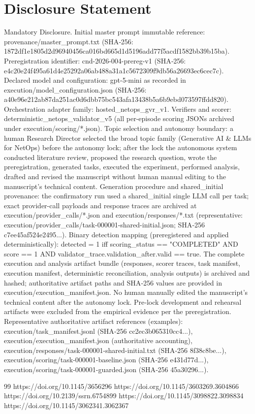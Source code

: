 \documentclass[conference]{IEEEtran}
\begin{document}
\section*{Disclosure Statement}
Mandatory Disclosure. Initial master prompt immutable reference: provenance/master\_prompt.txt (SHA‑256: 1872df1e1805d2d96940456ca016bd665d1d5196add77f5acdf1582bb39b15ba). Preregistration identifier: cnd-2026-004-prereg-v1 (SHA‑256: e4c20e24f495a61d4e25292a06ab488a31a1c5672309f9db56a26693ec6cec7c). Declared model and configuration: gpt-5-mini as recorded in execution/model\_configuration.json (SHA‑256: a40e96e212ab87da251ac0d6dbb75bc543afa13438b5a6b9ebd073597ffdd820). Orchestration adapter family: hosted\_netops\_gvr\_v1. Verifiers and scorer: deterministic\_netops\_validator\_v5 (all per-episode scoring JSONs archived under execution/scoring/*.json). Topic selection and autonomy boundary: a human Research Director selected the broad topic family (Generative AI \& LLMs for NetOps) before the autonomy lock; after the lock the autonomous system conducted literature review, proposed the research question, wrote the preregistration, generated tasks, executed the experiment, performed analysis, drafted and revised the manuscript without human manual editing to the manuscript's technical content. Generation procedure and shared\_initial provenance: the confirmatory run used a shared\_initial single LLM call per task; exact provider-call payloads and response traces are archived at execution/provider\_calls/*.json and execution/responses/*.txt (representative: execution/provider\_calls/task-000001-shared-initial.json; SHA‑256 c7ee45af524e2495...). Binary detection mapping (preregistered and applied deterministically): detected = 1 iff scoring\_status == "COMPLETED" AND score == 1 AND validator\_trace.validation\_after.valid == true. The complete execution and analysis artifact bundle (responses, scorer traces, task manifest, execution manifest, deterministic reconciliation, analysis outputs) is archived and hashed; authoritative artifact paths and SHA‑256 values are provided in execution/execution\_manifest.json. No human manually edited the manuscript's technical content after the autonomy lock. Pre‑lock development and rehearsal artifacts were excluded from the empirical evidence per the preregistration. Representative authoritative artifact references (examples): execution/task\_manifest.jsonl (SHA‑256 cc2ec3b065310cc4...), execution/execution\_manifest.json (authoritative accounting), execution/responses/task-000001-shared-initial.txt (SHA‑256 8f38c8be...), execution/scoring/task-000001-baseline.json (SHA‑256 e431d77d...), execution/scoring/task-000001-guarded.json (SHA‑256 45a30296...).

\begin{thebibliography}{99}
 https://doi.org/10.1145/3656296
 https://doi.org/10.1145/3603269.3604866
 https://doi.org/10.2139/ssrn.6754899
 https://doi.org/10.1145/3098822.3098834
 https://doi.org/10.1145/3062341.3062367
\end{thebibliography}
\end{document}
